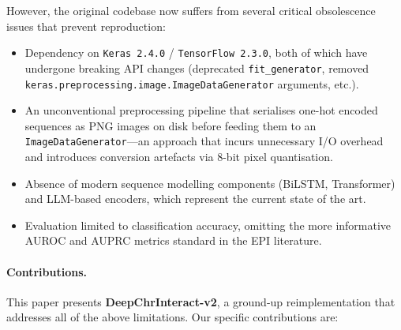 However, the original codebase now suffers from several critical obsolescence issues
that prevent reproduction:
\begin{itemize}[noitemsep]
  \item Dependency on \texttt{Keras~2.4.0} / \texttt{TensorFlow~2.3.0}, both of
        which have undergone breaking API changes (deprecated \texttt{fit\_generator},
        removed \texttt{keras.preprocessing}\discretionary{}{}{}\texttt{.image.ImageDataGenerator}
        arguments, etc.).
  \item An unconventional preprocessing pipeline that serialises one-hot encoded
        sequences as PNG images on disk before feeding them to an
        \texttt{ImageDataGenerator}---an approach that incurs unnecessary I/O
        overhead and introduces conversion artefacts via 8-bit pixel quantisation.
  \item Absence of modern sequence modelling components (BiLSTM, Transformer) and
        LLM-based encoders, which represent the current state of the art.
  \item Evaluation limited to classification accuracy, omitting the more informative
        AUROC and AUPRC metrics standard in the EPI literature.
\end{itemize}

\paragraph{Contributions.}
This paper presents \textbf{DeepChrInteract-v2}, a ground-up reimplementation that
addresses all of the above limitations.
Our specific contributions are:

